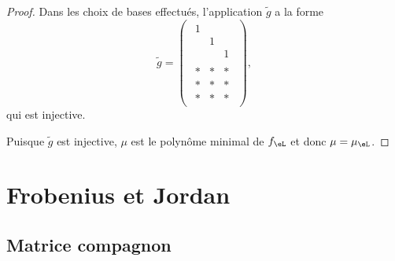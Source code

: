 \begin{proof}
	Dans les choix de bases effectués, l'application \( \tilde g\) a la forme
	\begin{equation}
		\tilde g=\begin{pmatrix}
			\begin{matrix}
				1 &   &   \\
				  & 1 &   \\
				  &   & 1
			\end{matrix} \\
			\begin{matrix}
				* & * & * \\
				* & * & * \\
				* & * & *
			\end{matrix}
		\end{pmatrix},
	\end{equation}
	qui est injective.

	Puisque \( \tilde g\) est injective, \( \mu\) est le polynôme minimal de \( f_{\eL}\) et donc \( \mu=\mu_{\eL}\).
\end{proof}

\section{Frobenius et Jordan}

\subsection{Matrice compagnon}


